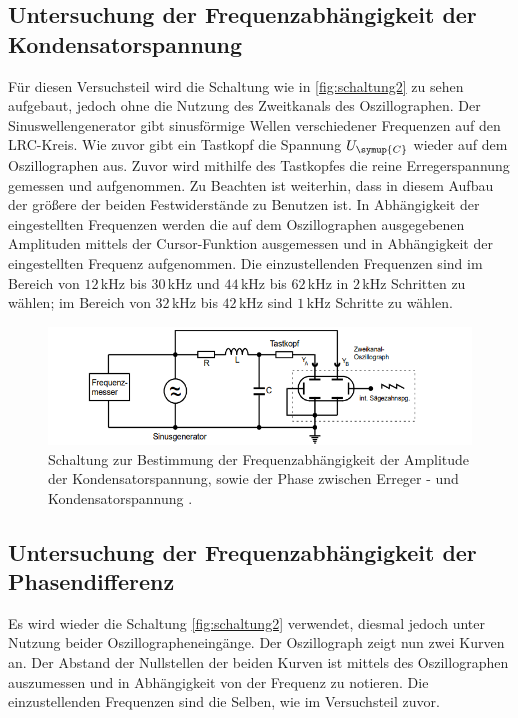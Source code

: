     \subsection{Untersuchung der Frequenzabhängigkeit der Kondensatorspannung}
        Für diesen Versuchsteil wird die Schaltung wie in \autoref{fig:schaltung2} zu sehen aufgebaut, jedoch ohne die Nutzung des Zweitkanals des Oszillographen.
        Der Sinuswellengenerator gibt sinusförmige Wellen verschiedener Frequenzen auf den LRC-Kreis. Wie zuvor gibt ein Tastkopf die Spannung $U_{\symup{C}}$
        wieder auf dem Oszillographen aus. Zuvor wird mithilfe des Tastkopfes die reine Erregerspannung gemessen und aufgenommen. Zu Beachten 
        ist weiterhin, dass in diesem Aufbau der größere der beiden Festwiderstände zu Benutzen ist. In Abhängigkeit der eingestellten Frequenzen
        werden die auf dem Oszillographen ausgegebenen Amplituden mittels der Cursor-Funktion ausgemessen und in Abhängigkeit der eingestellten
        Frequenz aufgenommen. Die einzustellenden Frequenzen sind im Bereich von $12$\,kHz bis $30$\,kHz und $44$\,kHz bis $62$\,kHz in $2$\,kHz Schritten zu wählen;
        im Bereich von $32$\,kHz bis $42$\,kHz sind $1$\,kHz Schritte zu wählen.
        \begin{figure}
            \centering
            \includegraphics[width=\textwidth]{content/s2.png}
            \caption{Schaltung zur Bestimmung der Frequenzabhängigkeit der Amplitude der Kondensatorspannung, sowie der Phase zwischen Erreger - und Kondensatorspannung \cite[296]{V354}.}
            \label{fig:schaltung2}
        \end{figure} 
    \subsection{Untersuchung der Frequenzabhängigkeit der Phasendifferenz}
        Es wird wieder die Schaltung \autoref{fig:schaltung2} verwendet, diesmal jedoch unter Nutzung beider Oszillographeneingänge. Der Oszillograph
        zeigt nun zwei Kurven an. Der Abstand der Nullstellen der beiden Kurven ist mittels des Oszillographen auszumessen und in 
        Abhängigkeit von der Frequenz zu notieren. Die einzustellenden Frequenzen sind die Selben, wie im Versuchsteil zuvor.    